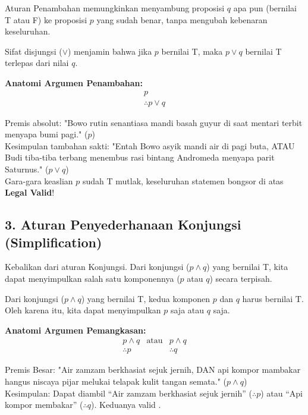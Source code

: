 Aturan Penambahan memungkinkan menyambung proposisi $q$ apa pun (bernilai T atau F) ke proposisi $p$ yang sudah benar, tanpa mengubah kebenaran keseluruhan.

\begin{teorema}
Sifat disjungsi ($\lor$) menjamin bahwa jika $p$ bernilai T, maka $p \lor q$ bernilai T terlepas dari nilai $q$.
\end{teorema}

\textbf{Anatomi Argumen Penambahan:}
\[
\begin{array}{c}
p \\
\hline
\therefore p \vee q
\end{array}
\]

\begin{contoh}
Premis absolut: "Bowo rutin senantiasa mandi basah guyur di saat mentari terbit menyapa bumi pagi." ($p$) \\
Kesimpulan tambahan sakti: "Entah Bowo asyik mandi air di pagi buta, ATAU Budi tiba-tiba terbang menembus rasi bintang Andromeda menyapa parit Saturnus." ($p \lor q$) \\
Gara-gara keaslian $p$ sudah T mutlak, keseluruhan statemen bongsor di atas \textbf{Legal Valid}!
\end{contoh}

\subsection{3. Aturan Penyederhanaan Konjungsi (Simplification)}

Kebalikan dari aturan Konjungsi. Dari konjungsi ($p \land q$) yang bernilai T, kita dapat menyimpulkan salah satu komponennya ($p$ atau $q$) secara terpisah.

\begin{teorema}[Penyederhanaan]
Dari konjungsi ($p \land q$) yang bernilai T, kedua komponen $p$ dan $q$ harus bernilai T. Oleh karena itu, kita dapat menyimpulkan $p$ saja atau $q$ saja.
\end{teorema}

\textbf{Anatomi Argumen Pemangkasan:}
\[
\begin{array}{ccc}
p \wedge q & \text{atau} & p \wedge q\\
\hline
\therefore p & & \therefore q
\end{array}
\]

\begin{contoh}
Premis Besar: "Air zamzam berkhasiat sejuk jernih, DAN api kompor mambakar hangus niscaya pijar melukai telapak kulit tangan semata." ($p \land q$) \\
Kesimpulan: Dapat diambil ``Air zamzam berkhasiat sejuk jernih'' ($\therefore p$) atau ``Api kompor membakar'' ($\therefore q$). Keduanya valid \cite{rosen2019}.
\end{contoh}
